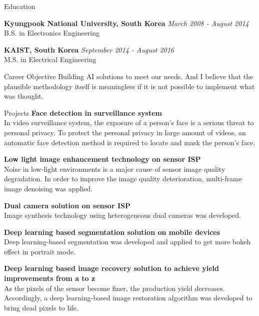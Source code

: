 \documentclass{resume}
\begin{document}
\begin{rSection}{Education}


{\bf Kyungpook National University, South Korea} \hfill {\em March 2008 - August 2014} 
\\ B.S. in Electronics Engineering\hfill 

{\bf KAIST, South Korea} \hfill {\em September 2014 - August 2016} 
\\ M.S. in Electrical Engineering\hfill

\end{rSection}

\begin{rSection}{Career Objective}
 Building AI solutions to meet our needs.
 And I believe that the plausible methodology itself is meaningless if it is not possible to implement what was thought.
\end{rSection}

\begin{rSection}{Projects}
{\bf Face detection in surveillance system }
\\ In video surveillance system, the exposure of a person’s face is a serious threat to personal privacy.
To protect the personal privacy in large amount of videos, an automatic face detection method is required to locate and mask the person’s face.

{\bf Low light image enhancement technology on sensor ISP}
\\ Noise in low-light environments is a major cause of sensor image quality degradation. In order to improve the image quality deterioration, multi-frame image denoising was applied.

{\bf Dual camera solution on sensor ISP}
\\ Image synthesis technology using heterogeneous dual cameras was developed.

{\bf Deep learning based segmentation solution on mobile devices}
\\ Deep learning-based segmentation was developed and applied to get more bokeh effect in portrait mode.

{\bf Deep learning based image recovery solution to achieve yield improvements from a to z}
\\ As the pixels of the sensor become finer, the production yield decreases. Accordingly, a deep learning-based image restoration algorithm was developed to bring dead pixels to life.

\end{rSection}
\end{document}
